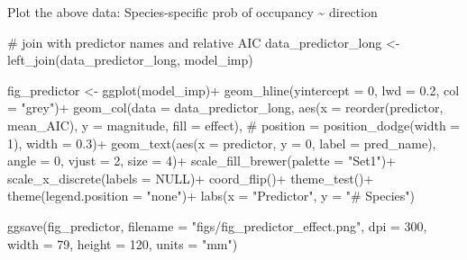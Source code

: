 \documentclass[]{article}
\newenvironment{Shaded}{}{}
\newcommand{\CommentTok}[1]{\textcolor[rgb]{0.00,0.50,0.00}{#1}}
\newcommand{\DataTypeTok}[1]{#1}
\newcommand{\DecValTok}[1]{#1}
\newcommand{\FloatTok}[1]{#1}
\newcommand{\KeywordTok}[1]{\textcolor[rgb]{0.00,0.00,1.00}{#1}}
\newcommand{\NormalTok}[1]{#1}
\newcommand{\OperatorTok}[1]{#1}
\newcommand{\OtherTok}[1]{\textcolor[rgb]{1.00,0.25,0.00}{#1}}
\newcommand{\StringTok}[1]{\textcolor[rgb]{0.00,0.50,0.50}{#1}}
\begin{document}
Plot the above data: Species-specific prob of occupancy \textasciitilde{} direction

\begin{Shaded}
\begin{Highlighting}[]
\CommentTok{# join with predictor names and relative AIC}
\NormalTok{data_predictor_long <-}\StringTok{ }\KeywordTok{left_join}\NormalTok{(data_predictor_long, model_imp)}
\end{Highlighting}
\end{Shaded}

\begin{Shaded}
\begin{Highlighting}[]
\NormalTok{fig_predictor <-}
\StringTok{  }\KeywordTok{ggplot}\NormalTok{(model_imp)}\OperatorTok{+}
\StringTok{  }\KeywordTok{geom_hline}\NormalTok{(}\DataTypeTok{yintercept =} \DecValTok{0}\NormalTok{,}
             \DataTypeTok{lwd =} \FloatTok{0.2}\NormalTok{,}
             \DataTypeTok{col =} \StringTok{"grey"}\NormalTok{)}\OperatorTok{+}
\StringTok{  }\KeywordTok{geom_col}\NormalTok{(}\DataTypeTok{data =}\NormalTok{ data_predictor_long,}
           \KeywordTok{aes}\NormalTok{(}\DataTypeTok{x =} \KeywordTok{reorder}\NormalTok{(predictor, mean_AIC),}
               \DataTypeTok{y =}\NormalTok{ magnitude,}
               \DataTypeTok{fill =}\NormalTok{ effect),}
           \CommentTok{# position = position_dodge(width = 1),}
           \DataTypeTok{width =} \FloatTok{0.3}\NormalTok{)}\OperatorTok{+}
\StringTok{  }\KeywordTok{geom_text}\NormalTok{(}\KeywordTok{aes}\NormalTok{(}\DataTypeTok{x =}\NormalTok{ predictor, }
                \DataTypeTok{y =} \DecValTok{0}\NormalTok{,}
                \DataTypeTok{label =}\NormalTok{ pred_name),}
            \DataTypeTok{angle =} \DecValTok{0}\NormalTok{,}
            \DataTypeTok{vjust =} \DecValTok{2}\NormalTok{,}
            \DataTypeTok{size =} \DecValTok{4}\NormalTok{)}\OperatorTok{+}
\StringTok{  }\KeywordTok{scale_fill_brewer}\NormalTok{(}\DataTypeTok{palette =} \StringTok{"Set1"}\NormalTok{)}\OperatorTok{+}
\StringTok{  }\KeywordTok{scale_x_discrete}\NormalTok{(}\DataTypeTok{labels =} \OtherTok{NULL}\NormalTok{)}\OperatorTok{+}
\StringTok{  }\KeywordTok{coord_flip}\NormalTok{()}\OperatorTok{+}
\StringTok{  }\KeywordTok{theme_test}\NormalTok{()}\OperatorTok{+}
\StringTok{  }\KeywordTok{theme}\NormalTok{(}\DataTypeTok{legend.position =} \StringTok{"none"}\NormalTok{)}\OperatorTok{+}
\StringTok{  }\KeywordTok{labs}\NormalTok{(}\DataTypeTok{x =} \StringTok{"Predictor"}\NormalTok{, }\DataTypeTok{y =} \StringTok{"# Species"}\NormalTok{)}

\KeywordTok{ggsave}\NormalTok{(fig_predictor,}
       \DataTypeTok{filename =} \StringTok{"figs/fig_predictor_effect.png"}\NormalTok{, }
       \DataTypeTok{dpi =} \DecValTok{300}\NormalTok{,}
       \DataTypeTok{width =} \DecValTok{79}\NormalTok{, }\DataTypeTok{height =} \DecValTok{120}\NormalTok{, }\DataTypeTok{units =} \StringTok{"mm"}\NormalTok{)}
    
\end{Highlighting}
\end{Shaded}
\end{document}
